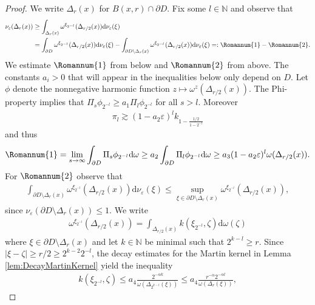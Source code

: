 \documentclass[a4paper,12pt]{article}
\theoremstyle{definition}
\theoremstyle{definition}
\begin{document}
	\begin{proof}
		We write $\Delta_r(x)$ for $B(x,r)\cap\partial D$. Fix some $l\in\mathbb N$ and observe that 
		\begin{align}\label{eq:SplittingBigBall}
			\nu_\varepsilon(\Delta_r(x))&\geq\int_{\Delta_r(x)}\omega^{\xi_{2^{-l}}}(\Delta_{r/2}(x))\mathrm d\nu_{\varepsilon}(\xi) \\
			&=\int_{\partial D}\omega^{\xi_{2^{-l}}}(\Delta_{r/2}(x))\mathrm d\nu_{\varepsilon}(\xi) -\int_{\partial D\setminus \Delta_{r}(x)}\omega^{\xi_{2^{-l}}}(\Delta_{r/2}(x))\mathrm d\nu_{\varepsilon}(\xi)=: \Romannum{1}-\Romannum{2}.
		\end{align}
		We estimate $\Romannum{1}$ from below and $\Romannum{2}$ from above. The constants $a_i>0$ that will appear in the inequalities below only depend on $D$.
		Let $\phi$ denote the nonnegative harmonic function $z\mapsto\omega^z(\Delta_{r/2}(x))$. The Phi-property implies that $\Pi_s\phi_{2^{-l}}\geq a_1\Pi_l\phi_{2^{-l}}$ for all $s>l$. Moreover 
		\begin{align*}
			\pi_l\gtrsim (1-a_2\varepsilon)^lk_{1-\frac{1/2}{1-2^{-l}}}
		\end{align*} 
		and thus
		\begin{align}\label{eq:IEstimate}
			\Romannum{1}=\lim_{s\rightarrow\infty}\int_{\partial D}\Pi_s\phi_{2^{-l}}\mathrm
			d\omega\geq a_2\int_{\partial D}\Pi_l\phi_{2^{-l}}\mathrm d\omega\geq a_3(1-a_2\varepsilon)^l\omega(\Delta_{r/2}(x)).
		\end{align}
		For $\Romannum{2}$ observe that
		\begin{align*}
			\int_{\partial D\setminus \Delta_{r}(x)}\omega^{\xi_{2^{-l}}}(\Delta_{r/2}(x))\mathrm d\nu_{\varepsilon}(\xi)\leq\sup_{\xi\in\partial D\setminus \Delta_{r}(x)}\omega^{\xi_{2^{-l}}}(\Delta_{r/2}(x)),
		\end{align*}
		since $\nu_{\varepsilon}(\partial D\setminus \Delta_r(x))\leq 1$.  We write
		\begin{align}\label{eq:HarmonicMeasIntegral}
			\omega^{\xi_{2^{-l}}}(\Delta_{r/2}(x))=\int_{\Delta_{r/2}(x)}k(\xi_{2^{-l}},\zeta)\mathrm d\omega(\zeta)
		\end{align}
		where $\xi\in \partial D\setminus \Delta_r(x)$ and let $k\in\mathbb N$ be minimal such that $2^{k-l}\geq r$. Since $|\xi-\zeta|\geq r/2\geq 2^{k-2}2^{-l}$, the decay estimates for the Martin kernel in Lemma \ref{lem:DecayMartinKernel} yield the inequality
		\begin{align*}
			k(\xi_{2^{-l}},\zeta)\leq a_4\frac{2^{-\alpha k}}{\omega(\Delta_{2^{k-l}}(\xi))}\leq a_4\frac{r^{-\alpha}2^{-\alpha l}}{\omega(\Delta_r(\xi))},

\end{align*}
\end{proof}
\end{document}
